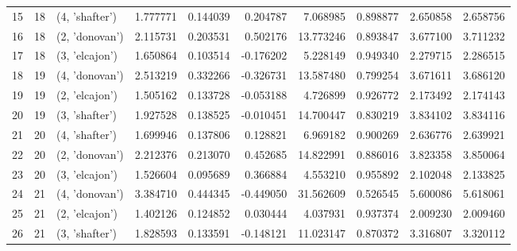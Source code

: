 \begin{tabular}{lrlrrrrrrr}
15 &     18 &  (4, 'shafter') &  1.777771 &   0.144039 &  0.204787 &   7.068985 &  0.898877 &   2.650858 &  2.658756 \\
16 &     18 &  (2, 'donovan') &  2.115731 &   0.203531 &  0.502176 &  13.773246 &  0.893847 &   3.677100 &  3.711232 \\
17 &     18 &  (3, 'elcajon') &  1.650864 &   0.103514 & -0.176202 &   5.228149 &  0.949340 &   2.279715 &  2.286515 \\
18 &     19 &  (4, 'donovan') &  2.513219 &   0.332266 & -0.326731 &  13.587480 &  0.799254 &   3.671611 &  3.686120 \\
19 &     19 &  (2, 'elcajon') &  1.505162 &   0.133728 & -0.053188 &   4.726899 &  0.926772 &   2.173492 &  2.174143 \\
20 &     19 &  (3, 'shafter') &  1.927528 &   0.138525 & -0.010451 &  14.700447 &  0.830219 &   3.834102 &  3.834116 \\
21 &     20 &  (4, 'shafter') &  1.699946 &   0.137806 &  0.128821 &   6.969182 &  0.900269 &   2.636776 &  2.639921 \\
22 &     20 &  (2, 'donovan') &  2.212376 &   0.213070 &  0.452685 &  14.822991 &  0.886016 &   3.823358 &  3.850064 \\
23 &     20 &  (3, 'elcajon') &  1.526604 &   0.095689 &  0.366884 &   4.553210 &  0.955892 &   2.102048 &  2.133825 \\
24 &     21 &  (4, 'donovan') &  3.384710 &   0.444345 & -0.449050 &  31.562609 &  0.526545 &   5.600086 &  5.618061 \\
25 &     21 &  (2, 'elcajon') &  1.402126 &   0.124852 &  0.030444 &   4.037931 &  0.937374 &   2.009230 &  2.009460 \\
26 &     21 &  (3, 'shafter') &  1.828593 &   0.133591 & -0.148121 &  11.023147 &  0.870372 &   3.316807 &  3.320112 \\
\bottomrule
\end{tabular}
